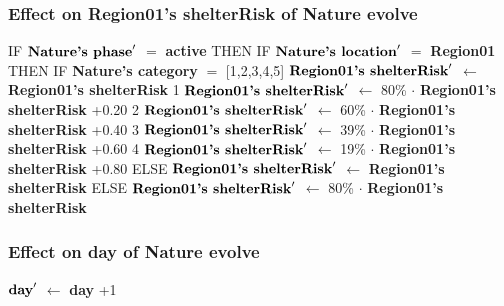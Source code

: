 \documentclass{article}%
\begin{document}
\subsubsection{Effect on Region01's shelterRisk of Nature evolve}%
\label{ssubsec:Effect on Region01's shelterRisk of Nature evolve}%
\begin{flushleft}%
IF %
$\mbox{\textbf{Nature's phase}} '$%
$=$%
\textbf{active}%
\linebreak%
\hspace*{2em}%
THEN %
IF %
$\mbox{\textbf{Nature's location}} '$%
$=$%
\textbf{Region01}%
\linebreak%
\hspace*{4em}%
THEN %
IF %
\textbf{Nature's category}%
$=$%
{[}1,2,3,4,5{]}%
\linebreak%
\hspace*{6em}%
$\mbox{\textbf{Region01's shelterRisk}} '$%
$\leftarrow$%
\textbf{Region01's shelterRisk}%
\linebreak%
\hspace*{6em}%
1 %
$\mbox{\textbf{Region01's shelterRisk}} '$%
$\leftarrow$%
80\%%
$\cdot$%
\textbf{Region01's shelterRisk}%
+0.20%
\linebreak%
\hspace*{6em}%
2 %
$\mbox{\textbf{Region01's shelterRisk}} '$%
$\leftarrow$%
60\%%
$\cdot$%
\textbf{Region01's shelterRisk}%
+0.40%
\linebreak%
\hspace*{6em}%
3 %
$\mbox{\textbf{Region01's shelterRisk}} '$%
$\leftarrow$%
39\%%
$\cdot$%
\textbf{Region01's shelterRisk}%
+0.60%
\linebreak%
\hspace*{6em}%
4 %
$\mbox{\textbf{Region01's shelterRisk}} '$%
$\leftarrow$%
19\%%
$\cdot$%
\textbf{Region01's shelterRisk}%
+0.80%
\linebreak%
\hspace*{4em}%
ELSE %
$\mbox{\textbf{Region01's shelterRisk}} '$%
$\leftarrow$%
\textbf{Region01's shelterRisk}%
\linebreak%
\hspace*{2em}%
ELSE %
$\mbox{\textbf{Region01's shelterRisk}} '$%
$\leftarrow$%
80\%%
$\cdot$%
\textbf{Region01's shelterRisk}%
\end{flushleft}

%
\subsubsection{Effect on day of Nature evolve}%
\label{ssubsec:Effect on day of Nature evolve}%
\begin{flushleft}%
$\mbox{\textbf{day}} '$%
$\leftarrow$%
\textbf{day}%
+1%
\end{flushleft}
\end{document}
